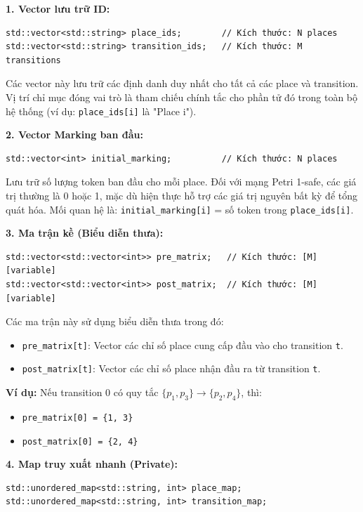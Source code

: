 \documentclass[12pt,a4paper]{article}
\begin{document}
\textbf{1. Vector lưu trữ ID:}
\begin{verbatim}
std::vector<std::string> place_ids;        // Kích thước: N places
std::vector<std::string> transition_ids;   // Kích thước: M transitions
\end{verbatim}

Các vector này lưu trữ các định danh duy nhất cho tất cả các place và transition. Vị trí chỉ mục đóng vai trò là tham chiếu chính tắc cho phần tử đó trong toàn bộ hệ thống (ví dụ: \texttt{place\_ids[i]} là "Place i").

\textbf{2. Vector Marking ban đầu:}
\begin{verbatim}
std::vector<int> initial_marking;          // Kích thước: N places
\end{verbatim}

Lưu trữ số lượng token ban đầu cho mỗi place. Đối với mạng Petri 1-safe, các giá trị thường là 0 hoặc 1, mặc dù hiện thực hỗ trợ các giá trị nguyên bất kỳ để tổng quát hóa. Mối quan hệ là: \texttt{initial\_marking[i]} = số token trong \texttt{place\_ids[i]}.

\textbf{3. Ma trận kề (Biểu diễn thưa):}
\begin{verbatim}
std::vector<std::vector<int>> pre_matrix;   // Kích thước: [M][variable]
std::vector<std::vector<int>> post_matrix;  // Kích thước: [M][variable]
\end{verbatim}

Các ma trận này sử dụng biểu diễn thưa trong đó:
\begin{itemize}
    \item \texttt{pre\_matrix[t]}: Vector các chỉ số place cung cấp đầu vào cho transition \texttt{t}.
    \item \texttt{post\_matrix[t]}: Vector các chỉ số place nhận đầu ra từ transition \texttt{t}.
\end{itemize}

\textbf{Ví dụ:} Nếu transition 0 có quy tắc $\{p_1, p_3\} \to \{p_2, p_4\}$, thì:
\begin{itemize}
    \item \texttt{pre\_matrix[0] = \{1, 3\}}
    \item \texttt{post\_matrix[0] = \{2, 4\}}
\end{itemize}

\textbf{4. Map truy xuất nhanh (Private):}
\begin{verbatim}
std::unordered_map<std::string, int> place_map;
std::unordered_map<std::string, int> transition_map;
\end{verbatim}
\end{document}
